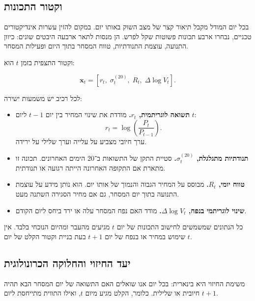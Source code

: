 \subsection{וקטור התכונות}

בכל יום המודל מקבל תיאור קצר של מצב השוק באותו יום. במקום להזין עשרות אינדיקטורים טכניים, נבחרו ארבע תכונות פשוטות שקל לפרש. הן מנסות לתאר ארבעה היבטים שונים: כיוון התנועה, עוצמת התנודתיות, טווח המסחר בתוך היום ופעילות המסחר.

וקטור התצפית בזמן \(t\) הוא:

\begin{equation}
\mathbf{x}_t = \left[r_t,\; \sigma_t^{(20)},\; R_t,\; \Delta\log V_t\right].
\end{equation}

לכל רכיב יש משמעות ישירה:

\begin{itemize}
    \item \textbf{תשואה לוגריתמית, \(r_t\).} מודדת את שינוי המחיר בין יום \(t-1\) ליום \(t\):
    \begin{equation}
    r_t = \log\left(\frac{P_t}{P_{t-1}}\right).
    \end{equation}
    ערך חיובי מצביע על עלייה וערך שלילי על ירידה.

    \item \textbf{תנודתיות מתגלגלת, \(\sigma_t^{(20)}\).} סטיית התקן של התשואות ב־20 הימים האחרונים. תכונה זו מתארת אם התקופה האחרונה הייתה רגועה או תנודתית.

    \item \textbf{טווח יומי, \(R_t\).} מבוסס על המחיר הגבוה והנמוך של אותו יום. הוא נותן מידע על עוצמת התנועה בתוך יום המסחר, גם אם מחיר הסגירה השתנה מעט.

    \item \textbf{שינוי לוגריתמי בנפח, \(\Delta\log V_t\).} מודד האם נפח המסחר עלה או ירד ביחס ליום הקודם.
\end{itemize}

כל הנתונים שמשמשים לחישוב התכונות של יום \(t\) מגיעים מהעבר ומהיום הנוכחי בלבד. אין שימוש במחיר או בנפח של יום \(t+1\) בעת בניית וקטור הקלט של יום \(t\).

\subsection{יעד החיזוי והחלוקה הכרונולוגית}

משימת החיזוי היא בינארית: בכל יום אנו שואלים האם התשואה של יום המסחר הבא תהיה חיובית או שלילית. כלומר, הקלט מגיע מיום \(t\), ואילו התווית מתייחסת ליום \(t+1\).

